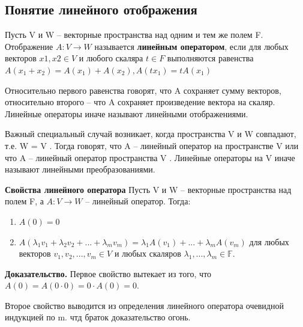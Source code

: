 \documentclass[a4paper]{article}
\begin{document}
    \newpage \begin{center}
                 \begin{Large}
                 \end{Large}
    \end{center}
    \subsection*{Понятие линейного отображения}

    Пусть V и W – векторные пространства над одним и тем же полем F.
    Отображение $A: V \rightarrow W$ называется \textbf{линейным оператором}, если
    для любых векторов $x1, x2 \in V$ и любого скаляра $t \in F$ выполняются
    равенства $A(x_1+x_2) = A(x_1) + A(x_2), A(tx_1) = tA(x_1)$

    Относительно первого равенства говорят, что A сохраняет сумму векторов,
    относительно второго – что A сохраняет произведение вектора на скаляр.
    Линейные операторы иначе называют линейными отображениями.

    Важный специальный случай возникает, когда пространства V и W
    совпадают, т.е. W = V . Тогда говорят, что A – линейный оператор
    на пространстве V или что A – линейный оператор пространства V .
    Линейные операторы на V иначе называют линейными преобразованиями.

    \begin{htheorem}
        \textbf{Свойства линейного оператора}
        Пусть V и W – векторные пространства над полем F, а $A: V \rightarrow W$ –
        линейный оператор. Тогда:
        \begin{enumerate}
            \item $A(0) = 0$
            \item $A(\lambda_1v_1 + \lambda_2v_2 + ... + \lambda_mv_m) = \lambda_1A(v_1)+...+\lambda_m A(v_m)$ для любых векторов $v_1,v_2, ..., v_m \in V$ и любых скаляров $\lambda_1, ..., \lambda_m \in \mathbb{F}$.
        \end{enumerate}
    \end{htheorem}

    \begin{hproof}
        \textbf{Доказательство.} Первое свойство вытекает из того, что $A(0) = A(0 \cdot 0) = 0 \cdot A(0) = 0$.

        Второе свойство выводится из определения линейного оператора очевидной индукцией по m. чтд браток доказательство огонь.
    \end{hproof}
\end{document}
